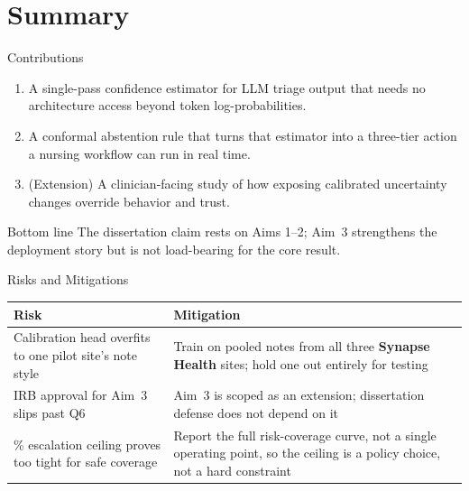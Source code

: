 \section{Summary}

\begin{frame}{Contributions}
  \begin{enumerate}[leftmargin=1.6em, label=\arabic*.]
    \item A single-pass confidence estimator for LLM triage output that
      needs no architecture access beyond token log-probabilities.
    \item A conformal abstention rule that turns that estimator into a
      three-tier action a nursing workflow can run in real time.
    \item (Extension) A clinician-facing study of how exposing calibrated
      uncertainty changes override behavior and trust.
  \end{enumerate}
  \par\vspace{8pt}
  \begin{tealbox}{Bottom line}
    \footnotesize
    The dissertation claim rests on Aims 1--2; Aim~3 strengthens the
    deployment story but is not load-bearing for the core result.
  \end{tealbox}
\end{frame}

\begin{frame}{Risks and Mitigations}
  \begin{table}
    \centering
    \small
    \begin{tabular}{p{4.3cm}p{5.9cm}}
      \toprule
      \textbf{Risk} & \textbf{Mitigation} \\
      \midrule
      Calibration head overfits to one pilot site's note style &
        Train on pooled notes from all three \textbf{Synapse Health}
        sites; hold one out entirely for testing \\
      \addlinespace
      IRB approval for Aim~3 slips past Q6 &
        Aim~3 is scoped as an extension; dissertation defense does not
        depend on it \\
      \addlinespace
      20\% escalation ceiling proves too tight for safe coverage &
        Report the full risk-coverage curve, not a single operating
        point, so the ceiling is a policy choice, not a hard constraint \\
      \bottomrule
    \end{tabular}
  \end{table}
\end{frame}

